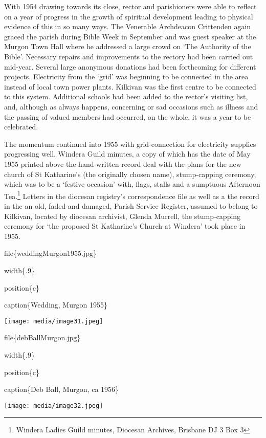 With 1954 drawing towards its close, rector and parishioners were able to reflect on a year of progress in the growth of spiritual development leading to physical evidence of this in so many ways. The Venerable Archdeacon Crittenden again graced the parish during Bible Week in September and was guest speaker at the Murgon Town Hall where he addressed a large crowd on `The Authority of the Bible'. Necessary repairs and improvements to the rectory had been carried out mid-year. Several large anonymous donations had been forthcoming for different projects. Electricity from the `grid' was beginning to be connected in the area instead of local town power plants. Kilkivan was the first centre to be connected to this system. Additional schools had been added to the rector's visiting list, and, although as always happens, concerning or sad occasions such as illness and the passing of valued members had occurred, on the whole, it was a year to be celebrated.

The momentum continued into 1955 with grid-connection for electricity supplies progressing well. Windera Guild minutes, a copy of which has the date of May 1955 printed above the hand-written record deal with the plans for the new church of St Katharine's (the originally chosen name), stump-capping ceremony, which was to be a `festive occasion' with, flags, stalls and a sumptuous Afternoon Tea.\footnote{Windera Ladies Guild minutes, Diocesan Archives, Brisbane DJ 3 Box 3} Letters in the diocesan registry's correspondence file as well as a the record in the an old, faded and damaged, Parish Service Register, assumed to belong to Kilkivan, located by diocesan archivist, Glenda Murrell, the stump-capping ceremony for `the proposed St Katharine's Church at Windera' took place in 1955.

file\{weddingMurgon1955.jpg\}

width\{.9\}

position\{c\}

caption\{Wedding, Murgon 1955\}

\texttt{[image: media/image31.jpeg]}

file\{debBallMurgon.jpg\}

width\{.9\}

position\{c\}

caption\{Deb Ball, Murgon, ca 1956\}

\texttt{[image: media/image32.jpeg]}

